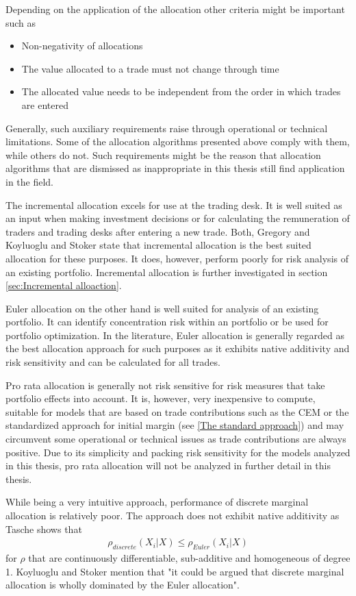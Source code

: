 \documentclass[../Thesis_AHoecherl.tex]{subfiles}
\begin{document}
Depending on the application of the allocation other criteria might be important such as
\begin{itemize}
    \item Non-negativity of allocations
    \item The value allocated to a trade must not change through time
    \item The allocated value needs to be independent from the order in which trades are entered 
\end{itemize}
Generally, such auxiliary requirements raise through operational or technical limitations. Some of the allocation algorithms presented above comply with them, while others do not. 
Such requirements might be the reason that allocation algorithms that are dismissed as inappropriate in this thesis still find application in the field.

The incremental allocation excels for use at the trading desk. It is well suited as an input when making investment decisions or for calculating the remuneration of traders and trading desks after entering a new trade.
Both, Gregory \cite{gregory2015xva} and Koyluoglu and Stoker \cite{koyluoglu2002risk} state that incremental allocation is the best suited allocation for these purposes. It does, however, perform poorly for risk analysis of an existing portfolio. Incremental allocation is further investigated in section \ref{sec:Incremental alloaction}.

Euler allocation on the other hand is well suited for analysis of an existing portfolio. It can identify concentration risk within an portfolio or be used for portfolio optimization. 
In the literature, Euler allocation is generally regarded as the best allocation approach for such purposes as it exhibits native additivity and risk sensitivity and can be calculated for all trades.

Pro rata allocation is generally not risk sensitive for risk measures that take portfolio effects into account.
It is, however, very inexpensive to compute, suitable for models that are based on trade contributions such as the \gls{CEM} or the standardized approach for initial margin (see \ref{The standard approach}) and may circumvent some operational or technical issues as trade contributions are always positive.
Due to its simplicity and packing risk sensitivity for the models analyzed in this thesis, pro rata allocation will not be analyzed in further detail in this thesis.

While being a very intuitive approach, performance of discrete marginal allocation is relatively poor. The approach does not exhibit native additivity as Tasche \cite{tasche2007} shows that 
\begin{align*}
    \rho_{discrete}\left(X_i|X\right) \leq \rho_{Euler}\left(X_i|X\right)
\end{align*}
for $\rho$ that are continuously differentiable, sub-additive and homogeneous of degree 1. 
Koyluoglu and Stoker \cite{koyluoglu2002risk} mention that "it could be argued that discrete marginal allocation is wholly dominated by the Euler allocation".
\end{document}
